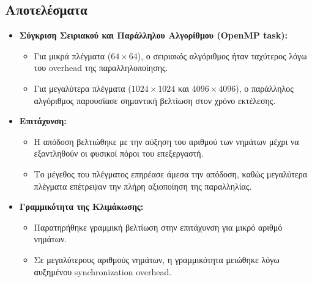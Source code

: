 \documentclass{article}
\begin{document}
\subsection*{Αποτελέσματα} 
\begin{itemize} 
    \item \textbf{Σύγκριση Σειριακού και Παράλληλου Αλγορίθμου (OpenMP task):} 
    \begin{itemize} 
        \item Για μικρά πλέγματα ($64 \times 64$), ο σειριακός αλγόριθμος ήταν ταχύτερος λόγω του overhead της παραλληλοποίησης. 
        \item Για μεγαλύτερα πλέγματα ($1024 \times 1024$ και $4096 \times 4096$), ο παράλληλος αλγόριθμος παρουσίασε σημαντική βελτίωση στον χρόνο εκτέλεσης. 
    \end{itemize} 
    \item \textbf{Επιτάχυνση:} 
    \begin{itemize} 
        \item Η απόδοση βελτιώθηκε με την αύξηση του αριθμού των νημάτων μέχρι να εξαντληθούν οι φυσικοί πόροι του επεξεργαστή. 
        \item Το μέγεθος του πλέγματος επηρέασε άμεσα την απόδοση, καθώς μεγαλύτερα πλέγματα επέτρεψαν την πλήρη αξιοποίηση της παραλληλίας. 
    \end{itemize} 
    \item \textbf{Γραμμικότητα της Κλιμάκωσης:}
    \begin{itemize}
        \item Παρατηρήθηκε γραμμική βελτίωση στην επιτάχυνση για μικρό αριθμό νημάτων. 
        \item Σε μεγαλύτερους αριθμούς νημάτων, η γραμμικότητα μειώθηκε λόγω αυξημένου synchronization overhead.
    \end{itemize}
\end{itemize}
\end{document}
